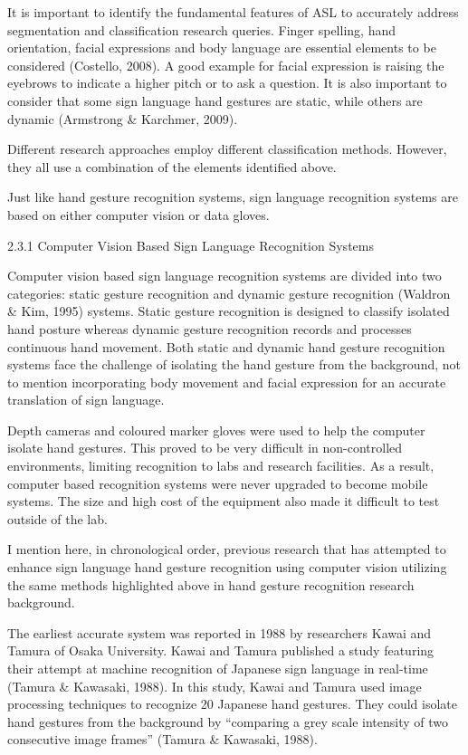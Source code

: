 It is important to identify the fundamental features of ASL to accurately address segmentation and classification research queries. Finger spelling, hand orientation, facial expressions and body language are essential elements to be considered (Costello, 2008). A good example for facial expression is raising the eyebrows to indicate a higher pitch or to ask a question. It is also important to consider that some sign language hand gestures are static, while others are dynamic (Armstrong & Karchmer, 2009). 

Different research approaches employ different classification methods. However, they all use a combination of the elements identified above.

Just like hand gesture recognition systems, sign language recognition systems are based on either computer vision or data gloves.

2.3.1 Computer Vision Based Sign Language Recognition Systems 

Computer vision based sign language recognition systems are divided into two categories: static gesture recognition and dynamic gesture recognition (Waldron & Kim, 1995) systems. Static gesture recognition is designed to classify isolated hand posture whereas dynamic gesture recognition records and processes continuous hand movement. Both static and dynamic hand gesture recognition systems face the challenge of isolating the hand gesture from the background, not to mention incorporating body movement and facial expression for an accurate translation of sign language. 

Depth cameras and coloured marker gloves were used to help the computer isolate hand gestures. This proved to be very difficult in non-controlled environments, limiting recognition to labs and research facilities. As a result, computer based recognition systems were never upgraded to become mobile systems. The size and high cost of the equipment also made it difficult to test outside of the lab.  

I mention here, in chronological order, previous research that has attempted to enhance sign language hand gesture recognition using computer vision utilizing the same methods highlighted above in hand gesture recognition research background.

The earliest accurate system was reported in 1988 by researchers Kawai and Tamura of Osaka University. Kawai and Tamura published a study featuring their attempt at machine recognition of Japanese sign language in real-time (Tamura & Kawasaki, 1988). In this study, Kawai and Tamura used image processing techniques to recognize 20 Japanese hand gestures. They could isolate hand gestures from the background by ``comparing a grey scale intensity of two consecutive image frames'' (Tamura & Kawasaki, 1988).

